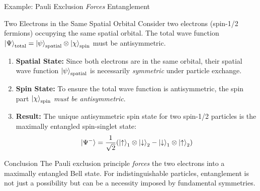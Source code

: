 
\begin{frame}{Example: Pauli Exclusion \emph{Forces} Entanglement}
  \begin{block}{Two Electrons in the Same Spatial Orbital}
    Consider two electrons (spin-1/2 fermions) occupying the same spatial
    orbital. The total wave function $\ket{\Psi}_{\text{total}} =
    \ket{\psi}_{\text{spatial}} \otimes \ket{\chi}_{\text{spin}}$ must be
    antisymmetric.
    \begin{enumerate}[<+->]
      \item \textbf{Spatial State:} Since both electrons are in the same
        orbital, their spatial wave function $\ket{\psi}_{\text{spatial}}$ is
        necessarily \emph{symmetric} under particle exchange.
      \item \textbf{Spin State:} To ensure the total wave function is
        antisymmetric, the spin part $\ket{\chi}_{\text{spin}}$ \emph{must be
        antisymmetric}.
      \item \textbf{Result:} The unique antisymmetric spin state for two
        spin-1/2 particles is the maximally entangled \alert{spin-singlet
        state}:
        \[
          \ket{\Psi^-} = \frac{1}{\sqrt{2}} (\ket{\uparrow}_1 \otimes
          \ket{\downarrow}_2 - \ket{\downarrow}_1 \otimes \ket{\uparrow}_2)
        \]
    \end{enumerate}
  \end{block}
\end{frame}

\begin{frame}
  \begin{alertblock}{Conclusion}
    The Pauli exclusion principle \emph{forces} the two electrons into a
    maximally entangled Bell state. For indistinguishable particles,
    entanglement is not just a possibility but can be a necessity imposed by
    fundamental symmetries.
  \end{alertblock}
\end{frame}


